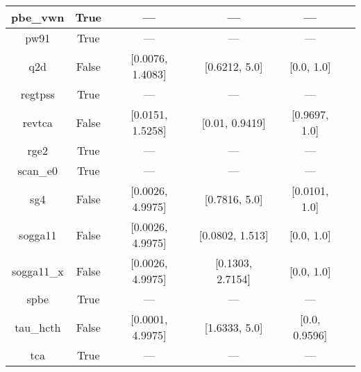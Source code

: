 \begin{tabular}{|c|c|c|c|c|l|}
      pbe\_vwn &                  True &              --- &              --- &              --- & \cite{Kraisler2010_042516,Perdew1996_3865,Perdew1996_3865_err} \\ \hline
          pw91 &                  True &              --- &              --- &              --- &          \cite{Perdew1991,Perdew1992_6671,Perdew1992_6671_err} \\ \hline
           q2d &                 False & [0.0076, 1.4083] &    [0.6212, 5.0] &       [0.0, 1.0] &                                       \cite{Chiodo2012_126402} \\ \hline
       regtpss &                  True &              --- &              --- &              --- &                                       \cite{Perdew2009_026403} \\ \hline
        revtca &                 False & [0.0151, 1.5258] &   [0.01, 0.9419] &    [0.9697, 1.0] &                                        \cite{Tognetti2008_536} \\ \hline
          rge2 &                  True &              --- &              --- &              --- &                                      \cite{Ruzsinszky2009_763} \\ \hline
      scan\_e0 &                  True &              --- &              --- &              --- &                                          \cite{Sun2015_036402} \\ \hline
           sg4 &                 False & [0.0026, 4.9975] &    [0.7816, 5.0] &    [0.0101, 1.0] &                                   \cite{Constantin2016_045126} \\ \hline
       sogga11 &                 False & [0.0026, 4.9975] &  [0.0802, 1.513] &       [0.0, 1.0] &                                       \cite{Peverati2011_1991} \\ \hline
    sogga11\_x &                 False & [0.0026, 4.9975] & [0.1303, 2.7154] &       [0.0, 1.0] &                                     \cite{Peverati2011_191102} \\ \hline
          spbe &                  True &              --- &              --- &              --- &                                        \cite{Swart2009_094103} \\ \hline
     tau\_hcth &                 False & [0.0001, 4.9975] &    [1.6333, 5.0] &    [0.0, 0.9596] &                                          \cite{Boese2002_9559} \\ \hline
           tca &                  True &              --- &              --- &              --- &                                     \cite{Tognetti2008_034101} \\ \hline

\end{tabular}
